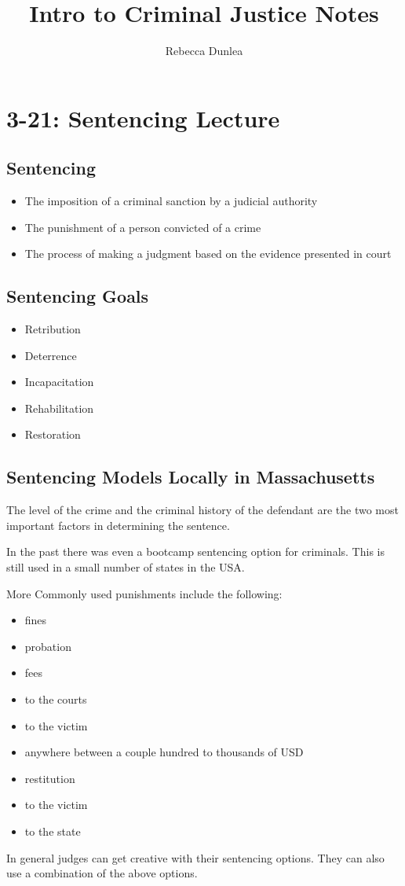 \documentclass[10pt]{article}
\title{Intro to Criminal Justice Notes}
\author{Rebecca Dunlea}
\begin{document}
\maketitle
\section*{3-21: Sentencing Lecture}
\subsection*{Sentencing}
\begin{itemize}
    \item The imposition of a criminal sanction by a judicial authority
    \item The punishment of a person convicted of a crime
    \item The process of making a judgment based on the evidence presented in court
\end{itemize}
\subsection*{Sentencing Goals}
\begin{itemize}
    \item Retribution
    \item Deterrence
    \item Incapacitation
    \item Rehabilitation
    \item Restoration

\end{itemize}

\subsection*{Sentencing Models Locally in Massachusetts}
The level of the crime and the criminal history of the defendant are the two most important factors in determining the sentence.

In the past there was even a bootcamp sentencing option for criminals. This is still used in a small number of states in the USA.

More Commonly used punishments include the following:
\begin{itemize}
    \item fines
    \item probation
    \item fees
    \item to the courts
    \item to the victim
    \item anywhere between a couple hundred to thousands of USD
    \item restitution
    \item to the victim
    \item to the state
\end{itemize}
In general judges can get creative with their sentencing options. They can also use a combination of the above options.
\end{document}
